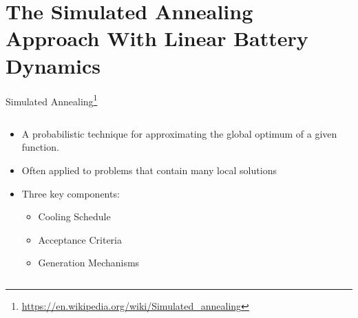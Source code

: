 \documentclass[aspectratio=169]{beamer}
\begin{document}
\section{The Simulated Annealing Approach With Linear Battery Dynamics}
\label{sec:org7229b2c}
\begin{frame}[label={sec:orgad871b4}]{Simulated Annealing\footnote{\url{https://en.wikipedia.org/wiki/Simulated\_annealing}}}
\begin{columns}
\begin{column}{0.5\columnwidth}
\begin{itemize}
\item A probabilistic technique for approximating the global optimum of a given function.
\item Often applied to problems that contain many local solutions
\item Three key components:
\begin{itemize}
\item Cooling Schedule
\item Acceptance Criteria
\item Generation Mechanisms
\end{itemize}
\end{itemize}
\end{column}

\begin{column}{0.5\columnwidth}
\centering
{}
\end{column}
\end{columns}
\end{frame}
\end{document}

